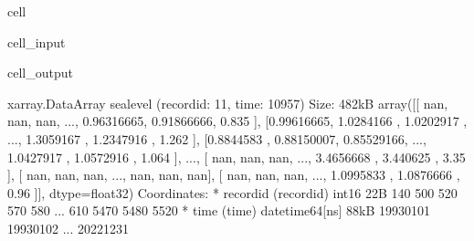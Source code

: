 \documentclass[letterpaper,10pt,english]{jupyterBook}
\begin{document}
\begin{sphinxuseclass}{cell}\begin{sphinxVerbatimInput}

\begin{sphinxuseclass}{cell_input}
\begin{sphinxVerbatim}[commandchars=\\\{\}]
\end{sphinxVerbatim}

\end{sphinxuseclass}\end{sphinxVerbatimInput}
\begin{sphinxVerbatimOutput}

\begin{sphinxuseclass}{cell_output}
\begin{sphinxVerbatim}[commandchars=\\\{\}]
\PYGZlt{}xarray.DataArray \PYGZsq{}sea\PYGZus{}level\PYGZsq{} (record\PYGZus{}id: 11, time: 10957)\PYGZgt{} Size: 482kB
array([[       nan,        nan,        nan, ..., 0.96316665, 0.91866666,
        0.835     ],
       [0.99616665, 1.0284166 , 1.0202917 , ..., 1.3059167 , 1.2347916 ,
        1.262     ],
       [0.8844583 , 0.88150007, 0.85529166, ..., 1.0427917 , 1.0572916 ,
        1.064     ],
       ...,
       [       nan,        nan,        nan, ..., 3.4656668 , 3.440625  ,
        3.35      ],
       [       nan,        nan,        nan, ...,        nan,        nan,
               nan],
       [       nan,        nan,        nan, ..., 1.0995833 , 1.0876666 ,
        0.96      ]], dtype=float32)
Coordinates:
  * record\PYGZus{}id  (record\PYGZus{}id) int16 22B 140 500 520 570 580 ... 610 5470 5480 5520
  * time       (time) datetime64[ns] 88kB 1993\PYGZhy{}01\PYGZhy{}01 1993\PYGZhy{}01\PYGZhy{}02 ... 2022\PYGZhy{}12\PYGZhy{}31
\end{sphinxVerbatim}

\end{sphinxuseclass}\end{sphinxVerbatimOutput}

\end{sphinxuseclass}
\end{document}
